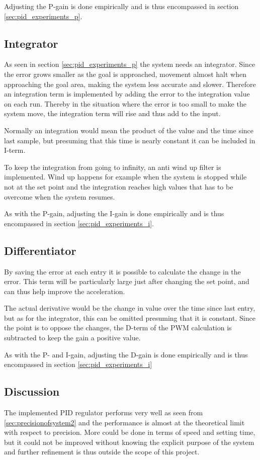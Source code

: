 Adjusting the P-gain is done empirically and is thus encompassed in section \ref{sec:pid_experiments_p}.

\subsection{Integrator}\label{sec:integrator}
As seen in section \ref{sec:pid_experiments_p} the system needs an integrator. Since the error grows smaller as the goal is approached, movement almost halt when approaching the goal area, making the system less accurate and slower. Therefore an integration term is implemented by adding the error to the integration value on each run. Thereby in the situation where the error is too small to make the system move, the integration term will rise and thus add to the input. 

Normally an integration would mean the product of the value and the time since last sample, but presuming that this time is nearly constant it can be included in I-term. 

To keep the integration from going to infinity, an anti wind up filter is implemented. Wind up happens for example when the system is stopped while not at the set point and the integration reaches high values that has to be overcome when the system resumes.

As with the P-gain, adjusting the I-gain is done empirically and is thus encompassed in section \ref{sec:pid_experiments_i}.

\subsection{Differentiator}
By saving the error at each entry it is possible to calculate the change in the error. This term will be particularly large just after changing the set point, and can thus help improve the acceleration. 

The actual derivative would be the change in value over the time since last entry, but as for the integrator, this can be omitted presuming that it is constant. Since the point is to oppose the changes, the D-term of the PWM calculation is subtracted to keep the gain a positive value.

As with the P- and I-gain, adjusting the D-gain is done empirically and is thus encompassed in section \ref{sec:pid_experiments_i}


\subsection{Discussion}
The implemented PID regulator performs very well as seen from \ref{sec:precisionofsystem2} and the performance is almost at the theoretical limit with respect to precision. More could be done in terms of speed and setting time, but it could not be improved without knowing the explicit purpose of the system and further refinement is thus outside the scope of this project.

